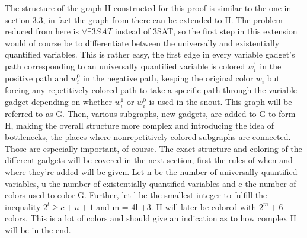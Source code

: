 \documentclass[12pt,a4paper]{article}
\begin{document}
The structure of the graph H constructed for this proof is similar to the one in section 3.3, in fact the graph from there can be extended to H. The problem reduced from here is $\forall \exists 3SAT$ instead of 3SAT, so the first step in this extension would of course be to differentiate between the universally and existentially quantified variables. This is rather easy, the first edge in every variable gadget's path corresponding to an universally quantified variable is colored $w^1_i$ in the positive path and $w^0_i$ in the negative path, keeping the original color $w_i$ but forcing any repetitively colored path to take a specific path through the variable gadget depending on whether $w^1_i$ or $w^0_i$ is used in the snout. This graph will be referred to as G.
\newline
Then, various subgraphs, new gadgets, are added to G to form H, making the overall structure more complex and introducing the idea of bottlenecks, the places where nonrepetitively colored subgraphs are connected. Those are especially important, of course. The exact structure and coloring of the different gadgets will be covered in the next section, first the rules of when and where they're added will be given. Let n be the number of universally quantified variables, u the number of existentially quantified variables and c the number of colors used to color G. Further, let l be the smallest integer to fulfill the inequality $2^l \geq c + u + 1$ and m = 4l +3. H will later be colored with $2^m +6$ colors. This is a lot of colors and should give an indication as to how complex H will be in the end.
\newline
\end{document}
